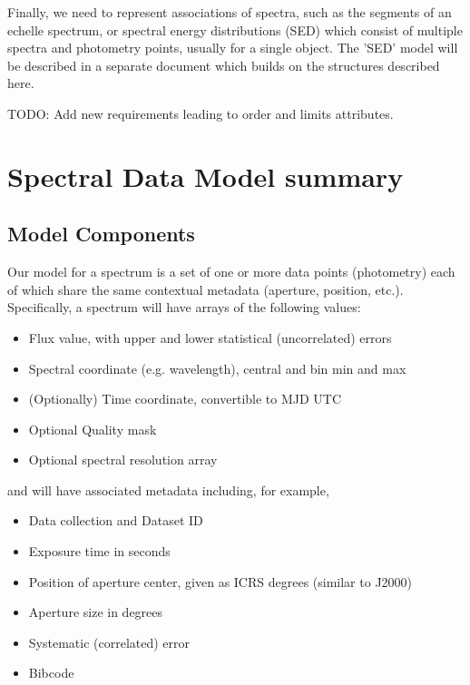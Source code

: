 \documentclass[11pt]{article}
\begin{document}
Finally, we need to represent associations of spectra,
such as the segments of an echelle spectrum, or
spectral energy distributions (SED) which
consist of multiple spectra and photometry points, usually for a single
object. The 'SED' model will be described in
a separate document which builds on the structures described here.

TODO: Add new requirements leading to order and limits attributes.


\section{Spectral Data Model summary}

\subsection{Model Components}

Our model for a spectrum is a set of one or more data points (photometry)  each of
which share the same contextual metadata  (aperture, position,
etc.). Specifically, a spectrum
will have arrays of the following values:

\vskip 0.1in

\colorbox{ipink}{
\begin{minipage}{0.9\textwidth}

\begin{itemize}
\item Flux value, with upper and lower statistical (uncorrelated) errors 
\item Spectral coordinate  (e.g. wavelength), central and bin min and max 
\item (Optionally) Time coordinate, convertible to MJD UTC
\item Optional Quality mask
\item Optional spectral resolution array
\end{itemize}
\end{minipage}
}

\vskip 0.1in

and will have associated metadata including, for example,

\vskip 0.1in

\colorbox{ipink}{
\begin{minipage}{0.9\textwidth}
\begin{itemize}
\item Data collection and Dataset ID
\item Exposure time in seconds
\item Position of aperture center, given as ICRS degrees
(similar to J2000)
\item Aperture size in degrees
\item Systematic (correlated) error
\item Bibcode
\end{itemize}
\end{minipage}
}
\end{document}
